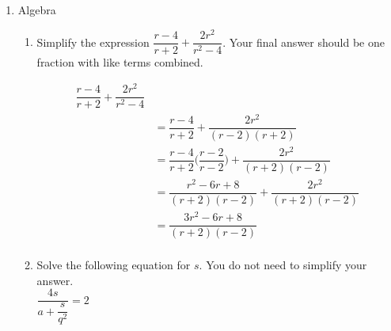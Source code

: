 \documentclass{article}
\begin{document}
\begin{enumerate}
\begin{enumerate}
        
        \item 
        \begin{problem}[\vfill \newpage]
            Is $f$ a continuous function? Explain why or why not (1 sentence).
        \end{problem}

    \begin{solution}
        The function $f(x)$ is not a continuous function, as it is undefined at $x=0$ and $x=5$. 
    \end{solution}
        
    \end{enumerate}
   
    \item Algebra
        \begin{enumerate}
            \item 
            \begin{problem}[\vfill]Simplify the expression $\dfrac{r - 4}{r + 2} + \dfrac{2r^2}{r^2 - 4}$. Your final answer should be one fraction with like terms combined. 
            \end{problem}

            \begin{solution}
                \begin{align*}
                    \dfrac{r-4}{r+2} + \dfrac{2r^2}{r^2-4} \\
                 &  =  \dfrac{r-4}{r+2} + \dfrac{2r^2}{(r-2)(r+2)} \\
                  & = \dfrac{r-4}{r+2} \Big(\dfrac{r-2}{r-2}\Big) + \dfrac{2r^2}{(r+2)(r-2)} \\
                 &  = \dfrac{r^2-6r + 8}{(r+2)(r-2)} + \dfrac{2r^2}{(r+2)(r-2)} \\
                 & = \dfrac{3r^2-6r+8}{(r+2)(r-2)}\\
                \end{align*}
            \end{solution}

            \item 
            \begin{problem}[\vfill]Solve the following equation for $s$. You do not need to simplify your answer.\\
            $\displaystyle \dfrac{4s}{a+\dfrac{s}{q^2}}=2$
            \end{problem}

            \begin{solution}
                

\end{solution}
\end{enumerate}
\end{enumerate}
\end{document}
